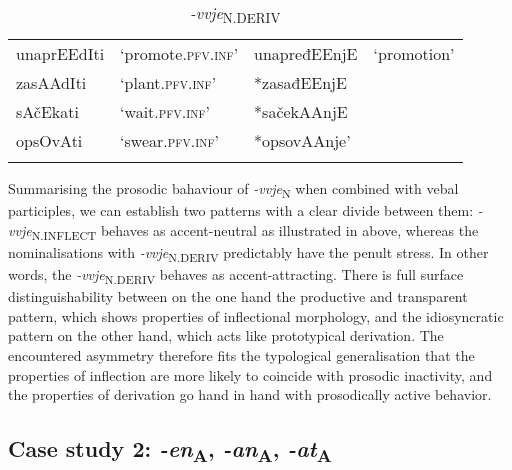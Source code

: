 \documentclass[output=paper]{langsci/langscibook}
\begin{document}
\begin{table}
\caption{\textit{-vvje}\textsubscript{N.DERIV}}
\label{tab4}
 \begin{tabular}{ l l|ll}
\lsptoprule
unaprEEdIti &`promote.\textsc{pfv.inf}'  & 
unapređEEnjE &`promotion' \\ 
zasAAdIti &`plant.\textsc{pfv.inf}'	&	*zasađEEnjE &\\
sAčEkati  &`wait.\textsc{pfv.inf}' 	& *sačekAAnjE &\\ 
opsOvAti &`swear.\textsc{pfv.inf}' & *opsovAAnje'& \\
 \lspbottomrule
 \end{tabular}
\end{table}

Summarising the prosodic bahaviour of \textit{-vvje}\textsubscript{N} when combined with vebal participles, we can establish two patterns with a clear divide between them: \mbox{\textit{-vvje}\textsubscript{N.INFLECT}} behaves as accent-neutral as illustrated in  above, whereas the nominalisations with \textit{-vvje}\textsubscript{N.DERIV} predictably have the penult stress. In other words, the \textit{-vvje}\textsubscript{N.DERIV} behaves as accent-attracting. 
There is full surface distinguishability between on the one hand the productive and transparent pattern, which shows properties of inflectional morphology, and the idiosyncratic pattern on the other hand, which acts like prototypical derivation. The encountered asymmetry therefore fits the typological generalisation that the properties of inflection are more likely to coincide with prosodic inactivity, and the properties of derivation go hand in hand with prosodically active behavior.


\subsection{Case study 2:  \textit{-en}\textsubscript{A}, \textit{-an}\textsubscript{A}, \textit{-at}\textsubscript{A}}\label{sec:simonovic:42}
\end{document}
